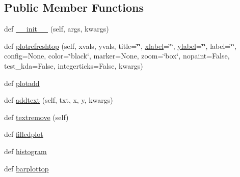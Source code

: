 \subsection*{Public Member Functions}
\begin{DoxyCompactItemize}
\item 
def \hyperlink{class_uni_dec_1_1unidec__modules_1_1plot1d_1_1_plot1d_a7a1a69f6af55c446f938af82b9fb96c8}{\+\_\+\+\_\+init\+\_\+\+\_\+} (self, args, kwargs)
\item 
def \hyperlink{class_uni_dec_1_1unidec__modules_1_1plot1d_1_1_plot1d_adbb157c158fd9d26712fba380b5eb382}{plotrefreshtop} (self, xvals, yvals, title=\char`\"{}\char`\"{}, \hyperlink{class_uni_dec_1_1unidec__modules_1_1plot1d_1_1_plot1d_ab6ee7aa1f3681f697cbe89a77f69418b}{xlabel}=\char`\"{}\char`\"{}, \hyperlink{class_uni_dec_1_1unidec__modules_1_1plot1d_1_1_plot1d_afe92dd02632dfc752ac2e3792ea9b865}{ylabel}=\char`\"{}\char`\"{}, label=\char`\"{}\char`\"{}, config=None, color=\char`\"{}black\char`\"{}, marker=None, zoom=\char`\"{}box\char`\"{}, nopaint=False, test\+\_\+kda=False, integerticks=False, kwargs)
\item 
def \hyperlink{class_uni_dec_1_1unidec__modules_1_1plot1d_1_1_plot1d_a6bc43ba5122b583355251181c1122912}{plotadd}
\item 
def \hyperlink{class_uni_dec_1_1unidec__modules_1_1plot1d_1_1_plot1d_a5aa9e32aa4c760f3b7bc2f192819930d}{addtext} (self, txt, x, y, kwargs)
\item 
def \hyperlink{class_uni_dec_1_1unidec__modules_1_1plot1d_1_1_plot1d_a77b843bb4cc41b1d9faf9bf0c3970bfe}{textremove} (self)
\item 
def \hyperlink{class_uni_dec_1_1unidec__modules_1_1plot1d_1_1_plot1d_a35a87cdee3f5b98c7c387c8832f0e6aa}{filledplot}
\item 
def \hyperlink{class_uni_dec_1_1unidec__modules_1_1plot1d_1_1_plot1d_a9b0bbb26eed816cd99fc3ee7fcef7312}{histogram}
\item 
def \hyperlink{class_uni_dec_1_1unidec__modules_1_1plot1d_1_1_plot1d_a0d4ecb314395fb6d845521d770878fac}{barplottop}
\end{DoxyCompactItemize}
